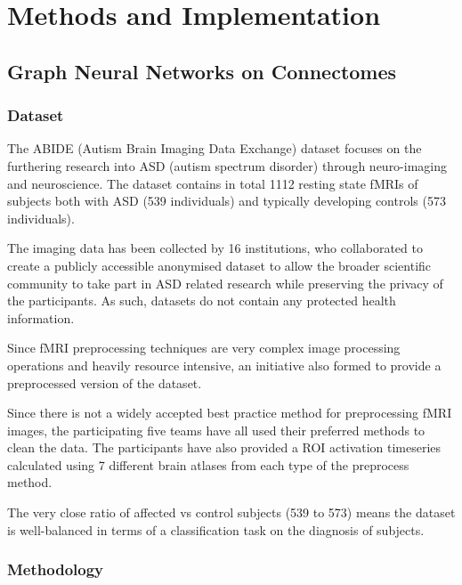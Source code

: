 \chapter{Methods and Implementation}

\section{Graph Neural Networks on Connectomes}

	\subsection{Dataset}
	
	The ABIDE (Autism Brain Imaging Data Exchange) dataset focuses on the furthering research into ASD (autism spectrum disorder) through neuro-imaging and neuroscience. The dataset contains in total 1112 resting state fMRIs of subjects both with ASD (539 individuals) and typically developing controls (573 individuals). 
	
	The imaging data has been collected by 16 institutions, who collaborated to create a publicly accessible anonymised dataset to allow the broader scientific community to take part in ASD related research while preserving the privacy of the participants. As such, datasets do not contain any protected health information. 
	
	Since fMRI preprocessing techniques are very complex image processing operations and heavily resource intensive, an initiative also formed to provide a preprocessed version of the dataset. 
	
	Since there is not a widely accepted best practice method for preprocessing fMRI images, the participating five teams have all used their preferred methods to clean the data. The participants have also provided a ROI activation timeseries calculated using 7 different brain atlases from each type of the preprocess method. 
	
	The very close ratio of affected vs control subjects (539 to 573) means the dataset is well-balanced in terms of a classification task on the diagnosis of subjects. 
	
	\subsection{Methodology}
	
